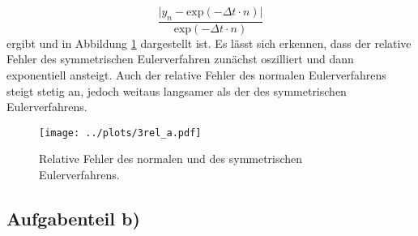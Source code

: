 \begin{equation}
  \frac{\lvert y_n-\text{exp}(-\Delta t \cdot n)\rvert}{\text{exp}(-\Delta t \cdot n)}
  \label{eqn:eulabw}
\end{equation}
ergibt und in Abbildung \ref{fig:eulerrel} dargestellt ist. Es lässt sich erkennen, dass der relative Fehler des
symmetrischen Eulerverfahren zunächst oszilliert und dann exponentiell ansteigt. Auch der relative Fehler
des normalen Eulerverfahrens steigt stetig an, jedoch weitaus langsamer als der des symmetrischen Eulerverfahrens.
\begin{figure}[H]
  \centering
  \texttt{[image: ../plots/3rel\_a.pdf]}
  \caption{Relative Fehler des normalen und des symmetrischen Eulerverfahrens.}
  \label{fig:eulerrel}
\end{figure}


\subsection*{Aufgabenteil b)}

